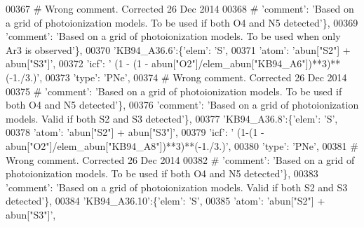 \begin{DoxyCode}
00367 \textcolor{comment}{# Wrong comment. Corrected 26 Dec 2014}
00368 \textcolor{comment}{#                                      'comment': 'Based on a grid of photoionization models. To be used if
       both O4 and N5 detected'\},}
00369                                      \textcolor{stringliteral}{'comment'}: \textcolor{stringliteral}{'Based on a grid of photoionization models. To be used when
       only Ar3 is observed'}\},
00370                          \textcolor{stringliteral}{'KB94\_A36.6'}:\{\textcolor{stringliteral}{'elem'}: \textcolor{stringliteral}{'S'},
00371                                      \textcolor{stringliteral}{'atom'}: \textcolor{stringliteral}{'abun["S2"] + abun["S3"]'},
00372                                      \textcolor{stringliteral}{'icf'}: \textcolor{stringliteral}{' (1 - (1 - abun["O2"]/elem\_abun["KB94\_A6"])**3)**(-1./3.)'},
00373                                       \textcolor{stringliteral}{'type'}: \textcolor{stringliteral}{'PNe'},
00374 \textcolor{comment}{# Wrong comment. Corrected 26 Dec 2014}
00375 \textcolor{comment}{#                                      'comment': 'Based on a grid of photoionization models. To be used if
       both O4 and N5 detected'\},}
00376                                       \textcolor{stringliteral}{'comment'}: \textcolor{stringliteral}{'Based on a grid of photoionization models. Valid if both
       S2 and S3 detected'}\},
00377                          \textcolor{stringliteral}{'KB94\_A36.8'}:\{\textcolor{stringliteral}{'elem'}: \textcolor{stringliteral}{'S'},
00378                                      \textcolor{stringliteral}{'atom'}: \textcolor{stringliteral}{'abun["S2"] + abun["S3"]'},
00379                                      \textcolor{stringliteral}{'icf'}: \textcolor{stringliteral}{' (1-(1 - abun["O2"]/elem\_abun["KB94\_A8"])**3)**(-1./3.)'},
00380                                       \textcolor{stringliteral}{'type'}: \textcolor{stringliteral}{'PNe'},
00381 \textcolor{comment}{# Wrong comment. Corrected 26 Dec 2014}
00382 \textcolor{comment}{#                                      'comment': 'Based on a grid of photoionization models. To be used if
       both O4 and N5 detected'\},}
00383                                       \textcolor{stringliteral}{'comment'}: \textcolor{stringliteral}{'Based on a grid of photoionization models. Valid if both
       S2 and S3 detected'}\},
00384                          \textcolor{stringliteral}{'KB94\_A36.10'}:\{\textcolor{stringliteral}{'elem'}: \textcolor{stringliteral}{'S'},
00385                                      \textcolor{stringliteral}{'atom'}: \textcolor{stringliteral}{'abun["S2"] + abun["S3"]'},

\end{DoxyCode}
